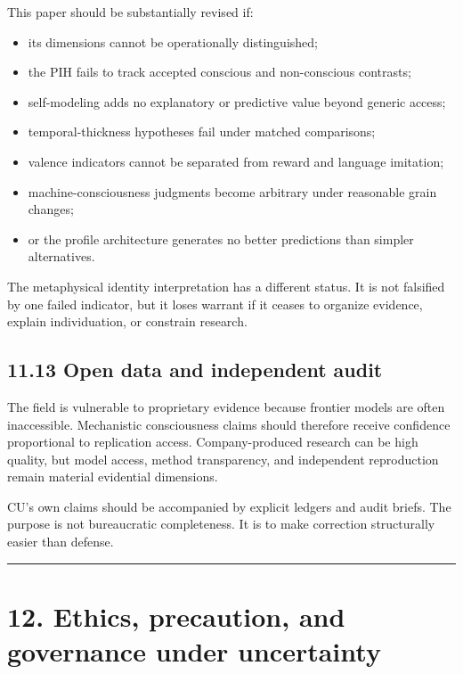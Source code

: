 \documentclass[
  11pt,
]{article}
\providecommand{\tightlist}{%
  \setlength{\itemsep}{0pt}\setlength{\parskip}{0pt}}
\begin{document}
This paper should be substantially revised if:

\begin{itemize}
\tightlist
\item
  its dimensions cannot be operationally distinguished;
\item
  the PIH fails to track accepted conscious and non-conscious contrasts;
\item
  self-modeling adds no explanatory or predictive value beyond generic
  access;
\item
  temporal-thickness hypotheses fail under matched comparisons;
\item
  valence indicators cannot be separated from reward and language
  imitation;
\item
  machine-consciousness judgments become arbitrary under reasonable
  grain changes;
\item
  or the profile architecture generates no better predictions than
  simpler alternatives.
\end{itemize}

The metaphysical identity interpretation has a different status. It is
not falsified by one failed indicator, but it loses warrant if it ceases
to organize evidence, explain individuation, or constrain research.

\subsection{11.13 Open data and independent
audit}\label{open-data-and-independent-audit}

The field is vulnerable to proprietary evidence because frontier models
are often inaccessible. Mechanistic consciousness claims should
therefore receive confidence proportional to replication access.
Company-produced research can be high quality, but model access, method
transparency, and independent reproduction remain material evidential
dimensions.

CU's own claims should be accompanied by explicit ledgers and audit
briefs. The purpose is not bureaucratic completeness. It is to make
correction structurally easier than defense.

\begin{center}\rule{0.5\linewidth}{0.5pt}\end{center}

\section{12. Ethics, precaution, and governance under
uncertainty}\label{ethics-precaution-and-governance-under-uncertainty}
\end{document}
